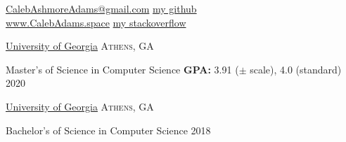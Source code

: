 \documentclass[10pt,a4paper]{article}
\begin{document}
\sloppy  %



\nobreakvspace{0.6em}  %

\noindent
\href{mailto:CalebAshmoreAdams@gmail.com}{CalebAshmoreAdams\mbox{}@\mbox{}gmail.com}
\hspace*{0pt}\hfill \href{https://github.com/piepieninja}{my github {\color{bluegreen} \faGithub}}
\\
\href{http://calebadams.space}{www.CalebAdams.space}
\hspace*{0pt}\hfill \href{https://stackoverflow.com/users/3704230/caleb-adams}{my stackoverflow {\color{bluegreen} \faStackOverflow}}
\\

\spacedhrule{0.2em}{-0.2em}
\spacedhrule{0.2em}{-0.2em}


\headedsection
  {\href{http://uga.edu}{University of Georgia}}
  {\textsc{Athens, GA}} {%
  \headedsubsection
    {Master's of Science in Computer Science}
    {\textbf{GPA:} 3.91 ($\pm$ scale), 4.0 (standard) \hspace{12mm} 2020}
    {\bodytext{}}

  }
\headedsection
  {\href{http://uga.edu}{University of Georgia}}
  {\textsc{Athens, GA}} {%
  \headedsubsection
    {Bachelor's of Science in Computer Science}
    {2018}
    {\bodytext{}}

  }



\spacedhrule{0em}{-0.4em}
\end{document}
